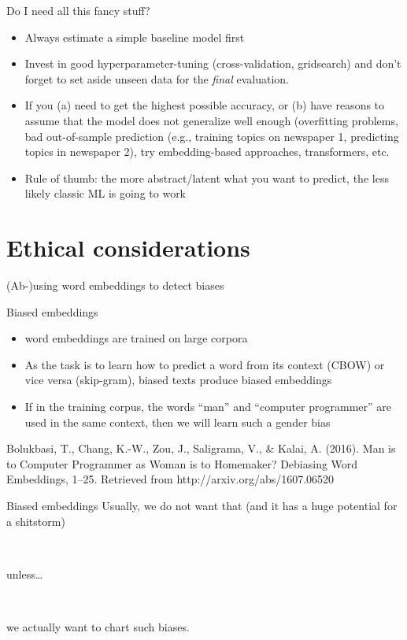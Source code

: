 \documentclass[compress]{beamer}
\begin{document}
\begin{frame}{Do I need all this fancy stuff?}
	\begin{itemize}[<+->]
		\item Always estimate a simple baseline model first
		\item Invest in good hyperparameter-tuning (cross-validation, gridsearch) and don't forget to set aside unseen data for the \emph{final} evaluation.
		\item If you (a) need to get the highest possible accuracy, or (b) have reasons to assume that the model does not generalize well enough (overfitting problems, bad out-of-sample prediction (e.g., training topics on newspaper 1, predicting topics in newspaper 2), try embedding-based approaches, transformers, etc.
		\item Rule of thumb: the more abstract/latent what you want to predict, the less likely classic ML is going to work
	\end{itemize}
\end{frame}


\section{Ethical considerations}

\begin{frame}[plain]
	(Ab-)using word embeddings to detect biases
\end{frame}

\begin{frame}{Biased embeddings}
	\begin{itemize}
		\item word embeddings are trained on large corpora
		\item As the task is to learn how to predict a word from its context (CBOW) or vice versa (skip-gram), biased texts produce biased embeddings
		\item If in the training corpus, the words ``man'' and ``computer programmer'' are used in the same context, then we will learn such a gender bias
	\end{itemize}
	
	\tiny{Bolukbasi, T., Chang, K.-W., Zou, J., Saligrama, V., \& Kalai, A. (2016). Man is to Computer Programmer as Woman is to Homemaker? Debiasing Word Embeddings, 1–25. Retrieved from http://arxiv.org/abs/1607.06520}
\end{frame}


\begin{frame}{Biased embeddings}
	Usually, we do not want that (and it has a huge potential for a shitstorm)
	
	~\\
	\pause
	
	unless\ldots
	
	~\\
	\pause
	
	we actually want to chart such biases.
	
\end{frame}
\end{document}
